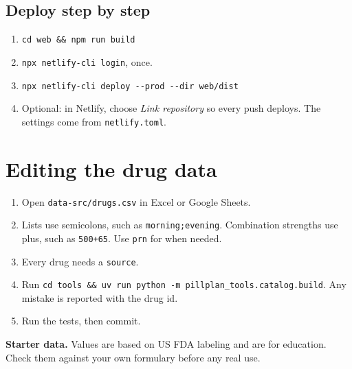 \documentclass[11pt]{article}
\begin{document}
\subsection{Deploy step by step}
\begin{enumerate}
  \item \texttt{cd web \&\& npm run build}
  \item \texttt{npx netlify-cli login}, once.
  \item \texttt{npx netlify-cli deploy {-}{-}prod {-}{-}dir web/dist}
  \item Optional: in Netlify, choose \emph{Link repository} so every push deploys. The settings come from \texttt{netlify.toml}.
\end{enumerate}

\section{Editing the drug data}
\begin{enumerate}
  \item Open \texttt{data-src/drugs.csv} in Excel or Google Sheets.
  \item Lists use semicolons, such as \texttt{morning;evening}. Combination strengths use plus, such as \texttt{500+65}. Use \texttt{prn} for when needed.
  \item Every drug needs a \texttt{source}.
  \item Run \texttt{cd tools \&\& uv run python -m pillplan\_tools.catalog.build}. Any mistake is reported with the drug id.
  \item Run the tests, then commit.
\end{enumerate}

\begin{note}[alert]
\textbf{Starter data.} Values are based on US FDA labeling and are for education. Check them against your own formulary before any real use.
\end{note}
\end{document}
